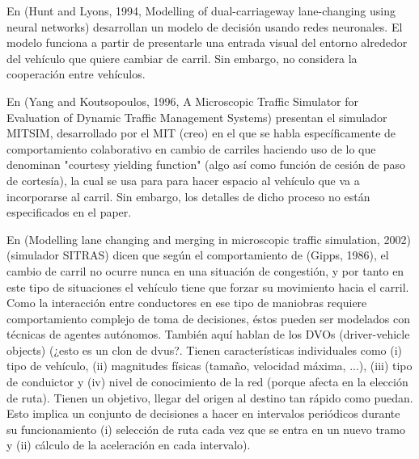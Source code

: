 En (Hunt and Lyons, 1994, Modelling of dual-carriageway lane-changing using neural networks) desarrollan un modelo de decisión usando redes neuronales. El modelo funciona a partir de presentarle una entrada visual del entorno alrededor del vehículo que quiere cambiar de carril. Sin embargo, no considera la cooperación entre vehículos.

En (Yang and Koutsopoulos, 1996, A Microscopic Traffic Simulator for Evaluation of Dynamic Traffic Management Systems) presentan el simulador MITSIM, desarrollado por el MIT (creo) en el que se habla específicamente de comportamiento colaborativo en cambio de carriles haciendo uso de lo que denominan "courtesy yielding function" (algo así como función de cesión de paso de cortesía), la cual se usa para para hacer espacio al vehículo que va a incorporarse al carril. Sin embargo, los detalles de dicho proceso no están especificados en el paper.

En (Modelling lane changing and merging in microscopic traffic simulation, 2002) (simulador SITRAS) dicen que según el comportamiento de (Gipps, 1986), el cambio de carril no ocurre nunca en una situación de congestión, y por tanto en este tipo de situaciones el vehículo tiene que forzar su movimiento hacia el carril. Como la interacción entre conductores en ese tipo de maniobras requiere comportamiento complejo de toma de decisiones, éstos pueden ser modelados con técnicas de agentes autónomos. También aquí hablan de los DVOs (driver-vehicle objects) (¿esto es un clon de \glspl{dvu}?. Tienen características individuales como (i) tipo de vehículo, (ii) magnitudes físicas (tamaño, velocidad máxima, ...), (iii) tipo de conduictor y (iv) nivel de conocimiento de la red (porque afecta en la elección de ruta). Tienen un objetivo, llegar del origen al destino tan rápido como puedan. Esto implica un conjunto de decisiones a hacer en intervalos periódicos durante su funcionamiento (i) selección de ruta cada vez que se entra en un nuevo tramo y (ii) cálculo de la aceleración en cada intervalo).

